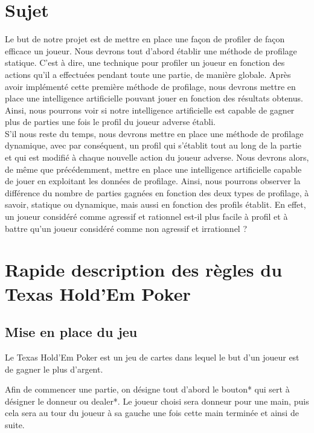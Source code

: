 \documentclass{report}
\begin{document}
\section{Sujet}
\hspace{0.5cm}Le but de notre projet est de mettre en place une façon de profiler de façon efficace un joueur. Nous devrons tout d'abord établir une méthode de profilage statique. C'est à dire, une technique pour profiler un joueur en fonction des actions qu'il a effectuées pendant toute une partie, de manière globale. Après avoir implémenté cette première méthode de profilage, nous devrons mettre en place une intelligence artificielle pouvant jouer en fonction des résultats obtenus. Ainsi, nous pourrons voir si notre intelligence artificielle est capable de gagner plus de parties une fois le profil du joueur adverse établi. \\
S'il nous reste du temps, nous devrons mettre en place une méthode de profilage dynamique, avec par conséquent, un profil qui s’établit tout au long de la partie et qui est modifié à chaque nouvelle action du joueur adverse. Nous devrons alors, de même que précédemment, mettre en place une intelligence artificielle capable de jouer en exploitant les données de profilage. Ainsi, nous pourrons observer la différence du nombre de parties gagnées en fonction des deux types de profilage, à savoir, statique ou dynamique, mais aussi en fonction des profils établit. En effet, un joueur considéré comme agressif et rationnel est-il plus facile à profil et à battre qu'un joueur considéré comme non agressif et irrationnel ?\par

\section{Rapide description des règles du Texas Hold'Em Poker}
\subsection{Mise en place du jeu}
\hspace{0.5cm}Le Texas Hold'Em Poker est un jeu de cartes dans lequel le but d'un joueur est de gagner le plus d'argent. \par
Afin de commencer une partie, on désigne tout d'abord le bouton* qui sert à désigner le donneur ou dealer*. Le joueur choisi sera donneur pour une main, puis cela sera au tour du joueur à sa gauche une fois cette main terminée et ainsi de suite.  \par
\end{document}
